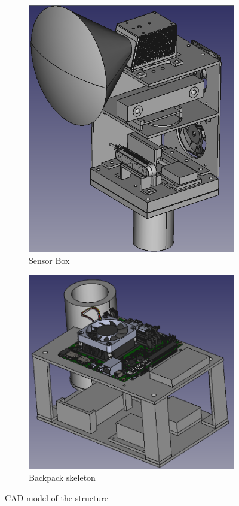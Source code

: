 \begin{figure}[H]
    \centering
    \begin{subfigure}{0.45\textwidth}
        \includegraphics[width=0.9\linewidth]{images/sensor_box.png} 
        \caption{Sensor Box}
        \label{fig: sensor box}
    \end{subfigure}
    \begin{subfigure}{0.45\textwidth}
        \includegraphics[width=0.9\linewidth]{images/backpack_skeleton.png}
        \caption{Backpack skeleton}
        \label{fig: backpack skeleton}
    \end{subfigure}
    \caption{CAD model of the structure}
    \label{fig: mechanical structure}
\end{figure}



